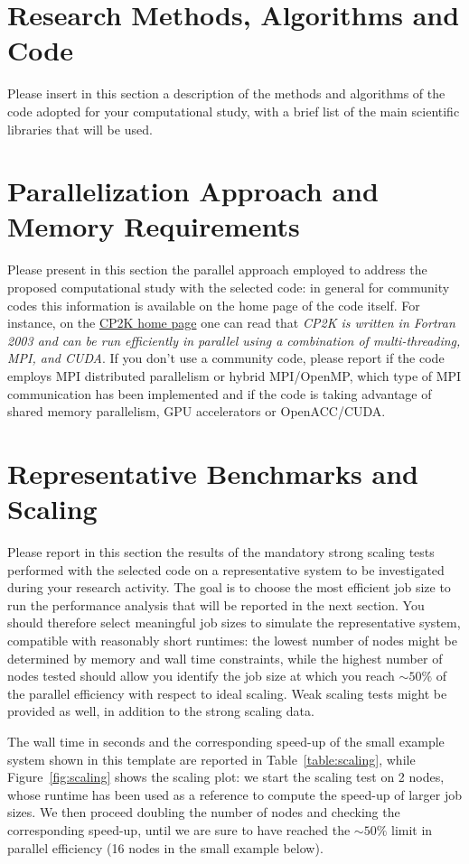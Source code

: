 \documentclass[11pt]{article}
\begin{document}
\section{Research Methods, Algorithms and Code}
Please insert in this section a description of the methods and algorithms of the code adopted for 
your computational study, with a brief list of the main scientific libraries that will be used. 

\section{Parallelization Approach and Memory Requirements}
Please present in this section the parallel approach employed to address the proposed computational study with the selected code: 
in general for community codes this information is available on the home page of the code itself.
For instance, on the \href{www.cp2k.org}{CP2K home page} one can read that \emph{CP2K is written in Fortran 2003 and can be run 
efficiently in parallel using a combination of multi-threading, MPI, and CUDA}.
If you don't use a community code, please report if the code employs MPI distributed parallelism or hybrid MPI/OpenMP, 
which type of MPI communication has been implemented and if the code is taking advantage of shared memory parallelism, 
GPU accelerators or OpenACC/CUDA.

\section{Representative Benchmarks and Scaling}
Please report in this section the results of the mandatory strong scaling tests performed with the selected code on a representative system 
to be investigated during your research activity. 
The goal is to choose the most efficient job size to run the performance analysis that will be reported in the next section. 
You should therefore select meaningful job sizes to simulate the representative system, compatible with reasonably short runtimes: 
the lowest number of nodes might be determined by memory and wall time constraints, while the highest number of nodes tested 
should allow you identify the job size at which you reach $\sim 50\%$ of the parallel efficiency with respect to ideal scaling. 
Weak scaling tests might be provided as well, in addition to the strong scaling data. 

The wall time in seconds and the corresponding speed-up of the small example system shown in this template are reported 
in Table~\ref{table:scaling}, while Figure~\ref{fig:scaling} shows the scaling plot: we start the scaling test 
on 2 nodes, whose runtime has been used as a reference to compute the speed-up of larger job sizes. 
We then proceed doubling the number of nodes and checking the corresponding speed-up, until we are sure to have reached the $\sim 50\%$ 
limit in parallel efficiency (16 nodes in the small example below).
\end{document}
